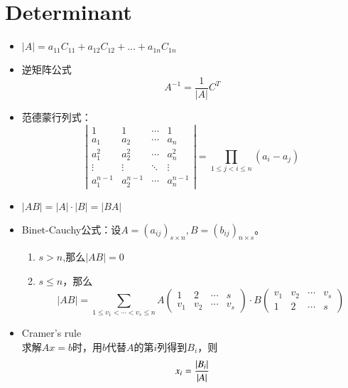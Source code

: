\documentclass[UTF8,9pt]{ctexart}
\begin{document}
\section{Determinant} 
\begin{itemize}
	\item $| A | = a _ { 11 } C _ { 11 } + a _ { 12 } C _ { 12 } + \ldots + a _ { 1 n } C _ { 1 n }$ 
	\item 逆矩阵公式
		$$A ^ { - 1 } = \frac { 1 } { | A | } C ^ { T }$$
	\item 范德蒙行列式：
		$$\left|\begin{matrix}
			1         & 1         & \cdots & 1         \\
			a_1       & a_2       & \cdots & a_n       \\
			a_1^2     & a_2^2     & \cdots & a_n^2     \\
			\vdots    & \vdots    & \ddots & \vdots    \\
			a_1^{n-1} & a_2^{n-1} & \cdots & a_n^{n-1}
		\end{matrix}\right|=\prod_{1\leq j < i \leq n}{(a_i-a_j)}$$
	\item $|AB|=|A|\cdot|B|=|BA|$
	\item Binet-Cauchy公式：设$A=(a_{ij})_{s\times n},B=(b_{ij})_{n\times s}$。\\
		\begin{enumerate}
			\item $s>n$,那么$|AB|=0$\\
			\item $s \leq n$，那么
				$$|AB|=\sum_{1 \leq v_1<\cdots<v_s\leq n}A
				\left(\begin{smallmatrix}
					1   &   2 & \cdots &  s\\
					v_1 & v_2 & \cdots & v_s
				\end{smallmatrix}\right)
				\cdot B
				\left(\begin{smallmatrix}
					v_1 & v_2 & \cdots & v_s\\
					1   &   2 & \cdots &   s
				\end{smallmatrix}\right)$$
		\end{enumerate}
	\item Cramer's rule\\
		求解$Ax=b$时，用$b$代替$A$的第$i$列得到$B_i$，则
		$$x_i=\frac{|B_i|}{|A|}$$
\end{itemize}
\end{document}
